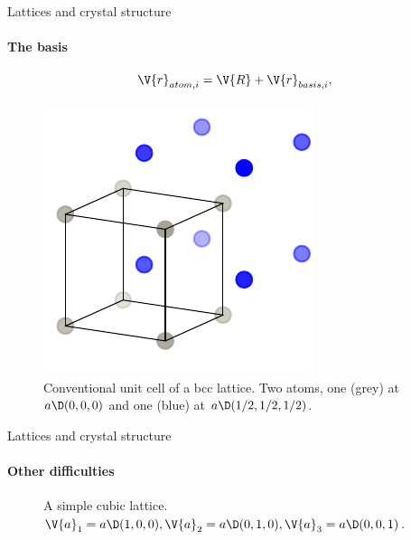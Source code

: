 \documentclass{beamer}
\begin{document}
\begin{frame}{Lattices and crystal structure}
\framesubtitle{The basis}
\pause
\begin{equation*}
	\V{r}_{atom,i} = \V{R} + \V{r}_{basis, i},
\end{equation*}
\pause
\begin{figure}[H]
	\centering
	\includegraphics[width=.35\linewidth]{figures/lattice_unfinished_1.pdf}
	\caption{Conventional unit cell of a bcc lattice. Two atoms, one (grey) at $ a \D (0,0,0) $ and one (blue) at $ a\D(1/2, 1/2, 1/2) $.}
\end{figure}
\end{frame}

\begin{frame}{Lattices and crystal structure}
\framesubtitle{Other difficulties}
\begin{figure}[H]
	\centering
	\caption{A simple cubic lattice. $ \V{a}_1 = a\D (1,0,0), \V{a}_2 = a\D(0,1,0), \V{a}_3 = a\D (0,0,1) $.}
	\label{fig:cubic_no_grid}
\end{figure}
\end{frame}
\end{document}
